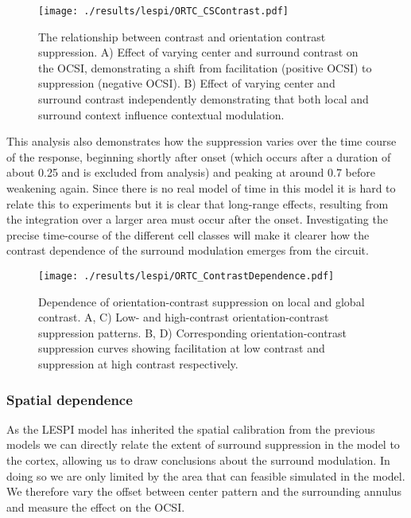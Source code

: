 \begin{figure}
	\centering
        \texttt{[image: ./results/lespi/ORTC\_CSContrast.pdf]}
	\caption[Contrast dependent switch from facilitation to
      suppression.]{The relationship between contrast and orientation
      contrast suppression. A) Effect of varying center and surround
      contrast on the OCSI, demonstrating a shift from facilitation
      (positive OCSI) to suppression (negative OCSI). B) Effect of
      varying center and surround contrast independently demonstrating
      that both local and surround context influence contextual
      modulation.}
	\label{ORTC_ContrastCurve}
\end{figure}

This analysis also demonstrates how the suppression varies over the
time course of the response, beginning shortly after onset (which
occurs after a duration of about 0.25 and is excluded from analysis)
and peaking at around 0.7 before weakening again. Since there is no
real model of time in this model it is hard to relate this to
experiments but it is clear that long-range effects, resulting from
the integration over a larger area must occur after the
onset. Investigating the precise time-course of the different cell
classes will make it clearer how the contrast dependence of the
surround modulation emerges from the circuit.

\begin{figure}
	\centering
        \texttt{[image: ./results/lespi/ORTC\_ContrastDependence.pdf]}
	\caption[Dependence of orientation-contrast suppression on local
      and global contrast.]{Dependence of orientation-contrast
      suppression on local and global contrast. A, C) Low- and
      high-contrast orientation-contrast suppression patterns. B, D)
      Corresponding orientation-contrast suppression curves showing
      facilitation at low contrast and suppression at high contrast
      respectively.}
	\label{ORTC_ContrastDependence}
\end{figure}

\subsubsection{Spatial dependence}

As the LESPI model has inherited the spatial calibration from the
previous models we can directly relate the extent of surround
suppression in the model to the cortex, allowing us to draw
conclusions about the surround modulation. In doing so we are only
limited by the area that can feasible simulated in the model. We
therefore vary the offset between center pattern and the surrounding
annulus and measure the effect on the OCSI.

